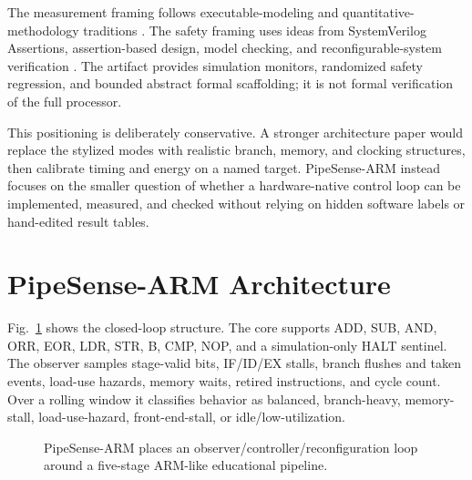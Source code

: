 \documentclass[conference]{IEEEtran}
\newcommand{\pipesense}{PipeSense-ARM}
\begin{document}
The measurement framing follows executable-modeling and quantitative-methodology traditions \cite{austin2002simplescalar,hennessy2017quantitative}. The safety framing uses ideas from SystemVerilog Assertions, assertion-based design, model checking, and reconfigurable-system verification \cite{ieee1800_2023,foster2004assertion,clarke1986automatic,borgatti2007integrated}. The artifact provides simulation monitors, randomized safety regression, and bounded abstract formal scaffolding; it is not formal verification of the full processor.

This positioning is deliberately conservative. A stronger architecture paper would replace the stylized modes with realistic branch, memory, and clocking structures, then calibrate timing and energy on a named target. \pipesense{} instead focuses on the smaller question of whether a hardware-native control loop can be implemented, measured, and checked without relying on hidden software labels or hand-edited result tables.

\section{PipeSense-ARM Architecture}

Fig.~\ref{fig:architecture} shows the closed-loop structure. The core supports ADD, SUB, AND, ORR, EOR, LDR, STR, B, CMP, NOP, and a simulation-only HALT sentinel. The observer samples stage-valid bits, IF/ID/EX stalls, branch flushes and taken events, load-use hazards, memory waits, retired instructions, and cycle count. Over a rolling window it classifies behavior as balanced, branch-heavy, memory-stall, load-use-hazard, front-end-stall, or idle/low-utilization.

\begin{figure}[t]
\centering
{}
\caption{\pipesense{} places an observer/controller/reconfiguration loop around a five-stage ARM-like educational pipeline.}
\label{fig:architecture}
\end{figure}
\end{document}
